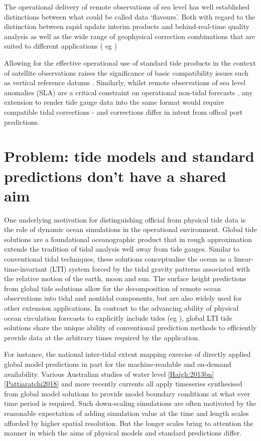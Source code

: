 The operational delivery of remote  observations of sea level has well established distinctions between what could be called data `flavours'.   Both with regard to the distinction between rapid update interim products and behind-real-time quality analysis as well as the wide range of geophysical  correction combinations that are suited to different applications ( eg \citep{Scharroo:2014vv} )


Allowing for the effective operational use of standard tide products in the context of satellite observations raises the significance of basic compatibility 
issues such as vertical reference datums \citep{10.3389/fmars.2020.549467}.
Similarly, whilst remote observations of sea level anomalies (SLA) are a critical constraint on operational non-tidal forecasts \citep{10.1080/1755876x.2019.1685834}, any extension to render tide gauge data into the same format would require compatible tidal corrections - and corrections differ in intent from offical port predictions.


\section{Problem: tide models and standard predictions don't have a shared aim}
\label{Sec:OfficialGlobal}

One underlying motivation for distinguishing official from physical tide data is the role of dynamic ocean simulations in the operational environment.  
Global tide solutions are a foundational oceanographic product that in rough approximation extends the tradition of tidal analysis well away from tide gauges.   Similar to conventional tidal techniques, these solutions conceptualise the ocean as a linear-time-invariant (LTI) system forced by the tidal gravity patterns associated with the relative motion of the earth, moon and sun.   The surface height predictions from global tide solutions allow for the decomposition of remote ocean observations into tidal and nontidal components, but are also widely used for other extension applications.
In contrast to the advancing ability of physical ocean circulation forecasts to explicitly include tides (eg \cite{10.1016/j.ocemod.2019.02.008}), global LTI tide solutions share the unique ability of conventional prediction methods to efficiently provide data at the arbitrary times required by the application.

For instance, the national inter-tidal extent mapping exercise of \cite{10.3390/rs10030480}  directly applied global model predictions in part for the machine-readable and on-demand availability.
Various Australian studies of water level \ref{Haigh:2013bn}\ref{Pattiaratchi2018} and more recently currents \cite{10.5194/os-2020-107} all apply timeseries synthesised from global model solutions to provide model boundary conditions at what ever time period is required.    Such down-scaling simulations are often motivated by the reasonable expectation of adding simulation value at the time and length scales afforded by higher spatial resolution.   But the longer scales bring to attention the manner in which the aims of physical models and standard predictions differ.

